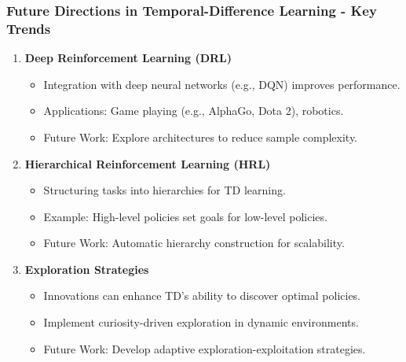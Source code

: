 \documentclass[aspectratio=169]{beamer}
\begin{document}
\begin{frame}[fragile]
    \frametitle{Future Directions in Temporal-Difference Learning - Key Trends}
    \begin{enumerate}
        \item \textbf{Deep Reinforcement Learning (DRL)}
            \begin{itemize}
                \item Integration with deep neural networks (e.g., DQN) improves performance.
                \item Applications: Game playing (e.g., AlphaGo, Dota 2), robotics.
                \item Future Work: Explore architectures to reduce sample complexity.
            \end{itemize}
        
        \item \textbf{Hierarchical Reinforcement Learning (HRL)}
            \begin{itemize}
                \item Structuring tasks into hierarchies for TD learning.
                \item Example: High-level policies set goals for low-level policies.
                \item Future Work: Automatic hierarchy construction for scalability.
            \end{itemize}

        \item \textbf{Exploration Strategies}
            \begin{itemize}
                \item Innovations can enhance TD's ability to discover optimal policies.
                \item Implement curiosity-driven exploration in dynamic environments.
                \item Future Work: Develop adaptive exploration-exploitation strategies.
            \end{itemize}
    \end{enumerate}
\end{frame}
\end{document}
